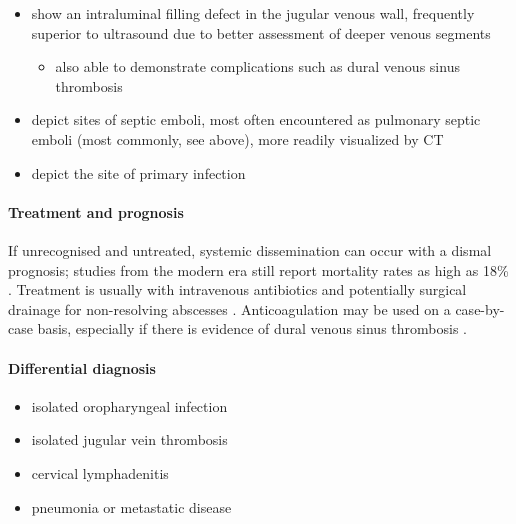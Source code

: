 \begin{itemize}
	\item
	show an intraluminal filling defect in the jugular venous wall, frequently superior to ultrasound due to better assessment of deeper venous segments
	
	\begin{itemize}
		\item
		also able to demonstrate complications such as dural venous sinus thrombosis
	\end{itemize}
	\item
	depict sites of septic emboli, most often encountered as pulmonary septic emboli (most commonly, see above), more readily visualized by CT
	\item
	depict the site of primary infection
\end{itemize}


\paragraph{Treatment and prognosis}

If unrecognised and untreated, systemic dissemination can occur with a dismal prognosis; studies from the modern era still report mortality rates as high as 18\% . Treatment is usually with intravenous antibiotics and potentially surgical drainage for non-resolving abscesses . Anticoagulation may be used on a case-by-case basis, especially if there is evidence of dural venous sinus thrombosis .

\paragraph{Differential diagnosis}

\begin{itemize}
	\item
	isolated oropharyngeal infection
	\item
	isolated jugular vein thrombosis
	\item
	cervical lymphadenitis
	\item
	pneumonia or metastatic disease
\end{itemize}